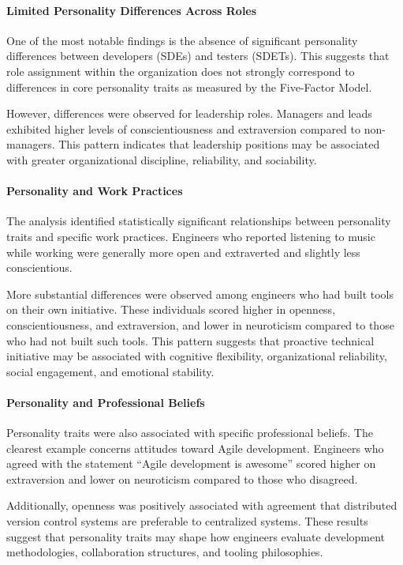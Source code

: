 \paragraph{Limited Personality Differences Across Roles}
One of the most notable findings is the absence of significant personality differences between developers (SDEs) and testers (SDETs). This suggests that role assignment within the organization does not strongly correspond to differences in core personality traits as measured by the Five-Factor Model.

However, differences were observed for leadership roles. Managers and leads exhibited higher levels of conscientiousness and extraversion compared to non-managers. This pattern indicates that leadership positions may be associated with greater organizational discipline, reliability, and sociability.

\paragraph{Personality and Work Practices}
The analysis identified statistically significant relationships between personality traits and specific work practices. Engineers who reported listening to music while working were generally more open and extraverted and slightly less conscientious.

More substantial differences were observed among engineers who had built tools on their own initiative. These individuals scored higher in openness, conscientiousness, and extraversion, and lower in neuroticism compared to those who had not built such tools. This pattern suggests that proactive technical initiative may be associated with cognitive flexibility, organizational reliability, social engagement, and emotional stability.

\paragraph{Personality and Professional Beliefs}
Personality traits were also associated with specific professional beliefs. The clearest example concerns attitudes toward Agile development. Engineers who agreed with the statement “Agile development is awesome” scored higher on extraversion and lower on neuroticism compared to those who disagreed.

Additionally, openness was positively associated with agreement that distributed version control systems are preferable to centralized systems. These results suggest that personality traits may shape how engineers evaluate development methodologies, collaboration structures, and tooling philosophies.

